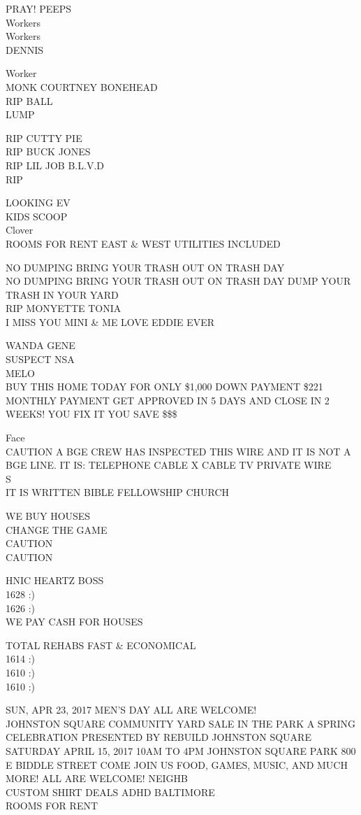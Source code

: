 \documentclass[10pt,letterpaper]{article}
\begin{document}
PRAY!  PEEPS\\
Workers\\
Workers\\
DENNIS

Worker\\
MONK COURTNEY BONEHEAD\\
RIP BALL\\
LUMP

RIP CUTTY PIE\\
RIP BUCK JONES\\
RIP LIL JOB B.L.V.D\\
RIP

LOOKING EV\\
KIDS SCOOP\\
Clover\\
ROOMS FOR RENT EAST \& WEST UTILITIES INCLUDED

NO DUMPING BRING YOUR TRASH OUT ON TRASH DAY\\
NO DUMPING BRING YOUR TRASH OUT ON TRASH DAY DUMP YOUR TRASH IN YOUR YARD\\
RIP MONYETTE TONIA\\
I MISS YOU MINI \& ME LOVE EDDIE EVER

WANDA GENE\\
SUSPECT NSA\\
MELO\\
BUY THIS HOME TODAY FOR ONLY \$1,000 DOWN PAYMENT \$221 MONTHLY PAYMENT GET APPROVED IN 5 DAYS AND CLOSE IN 2 WEEKS!  YOU FIX IT YOU SAVE \$\$\$

Face\\
CAUTION A BGE CREW HAS INSPECTED THIS WIRE AND IT IS NOT A BGE LINE.  IT IS: TELEPHONE CABLE X CABLE TV PRIVATE WIRE\\
S\\
IT IS WRITTEN BIBLE FELLOWSHIP CHURCH

WE BUY HOUSES\\
CHANGE THE GAME\\
CAUTION\\
CAUTION

HNIC HEARTZ BOSS\\
1628 :)\\
1626 :)\\
WE PAY CASH FOR HOUSES

TOTAL REHABS FAST \& ECONOMICAL\\
1614 :)\\
1610 :)\\
1610 :)

SUN, APR 23, 2017 MEN'S DAY ALL ARE WELCOME!\\
JOHNSTON SQUARE COMMUNITY YARD SALE IN THE PARK A SPRING CELEBRATION PRESENTED BY REBUILD JOHNSTON SQUARE SATURDAY APRIL 15, 2017 10AM TO 4PM JOHNSTON SQUARE PARK 800 E BIDDLE STREET COME JOIN US FOOD, GAMES, MUSIC, AND MUCH MORE! ALL ARE WELCOME!  NEIGHB\\
CUSTOM SHIRT DEALS ADHD BALTIMORE\\
ROOMS FOR RENT
\end{document}

